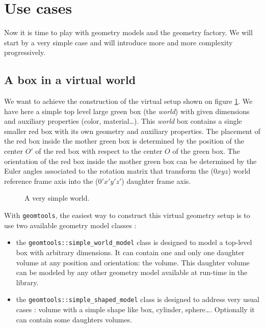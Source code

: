 
\section{Use cases}

Now it is time to play  with geometry models and the geometry factory.
We will start  by a very simple case and will  introduce more and more
complexity progressively.

\subsection{A box in a virtual world}

We  want to achieve  the construction  of the  virtual setup  shown on
figure \ref{fig:mf:0}.   We have here  a simple top level  large green
box (the \emph{world}) with  given dimensions and auxiliary properties
(color,  material\dots).   This \emph{world}  box  contains a  single
smaller red  box with its  own geometry and auxiliary  properties. The
placement of the red box inside  the mother green box is determined by
the position  of the center  $O'$ of the  red box with respect  to the
center $O$  of the green box.   The orientation of the  red box inside
the mother green box can  be determined by the Euler angles associated
to  the rotation matrix  that transform  the ($0xyz$)  world reference
frame axis into the ($0'x'y'z'$) daughter frame axis.


\begin{figure}[h]
\begin{center}
\scalebox{0.75}{}
\end{center}
\caption{A very simple world.}\label{fig:mf:0}
\end{figure}

With  \texttt{geomtools}, the  easiest way  to construct  this virtual
geometry setup is to use two available geometry model classes :
\begin{itemize} 

\item  the \texttt{geomtools::simple\_world\_model} class  is designed
  to model a  top-level box with arbitrary dimensions.  It can contain
  one and  only one daughter  volume at any position  and orientation:
  the  volume.   This daughter volume can be  modeled by any
  other geometry model available at run-time in the library.

\item the  \texttt{geomtools::simple\_shaped\_model} class is designed
  to address very  usual cases : volume with a  simple shape like box,
  cylinder,  sphere\dots.  Optionally  it  can contain  some  daughters
  volumes.

\end{itemize}

